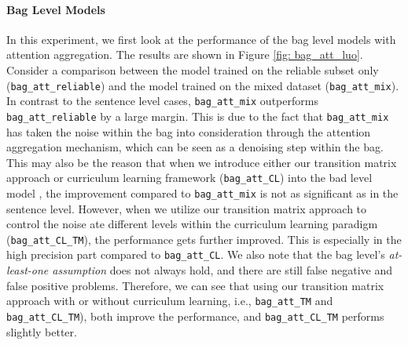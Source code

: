 \paragraph{Bag Level Models}
In this experiment, we first look at the performance of the bag level models with attention aggregation. The results are shown in Figure \ref{fig: bag_att_luo}.
Consider a comparison between the  model trained on the reliable subset only (\texttt{bag\_att\_reliable}) and  the model trained on the mixed dataset (\texttt{bag\_att\_mix}).
In contrast to the sentence level cases, \texttt{bag\_att\_mix} outperforms \texttt{bag\_att\_reliable} by a large margin. This is due to the fact that  \texttt{bag\_att\_mix} has taken the noise within the bag into consideration through the attention aggregation mechanism, which can be seen as a denoising step within the bag.
This may also be the reason that when we introduce either our transition matrix approach   or curriculum learning framework (\texttt{bag\_att\_CL})   into the bad level model , the improvement compared to \texttt{bag\_att\_mix}  is not as significant as in the sentence level.
However, when we utilize our transition matrix approach to control the noise ate different levels within the curriculum learning paradigm (\texttt{bag\_att\_CL\_TM}), the performance gets further improved. This is especially in the high precision part compared to \texttt{bag\_att\_CL}.
We also note that the bag level's  \textit{at-least-one assumption} does not always hold, and there are still false negative and false positive problems. Therefore, we can see that using our transition matrix approach with  or without curriculum learning, i.e.,  \texttt{bag\_att\_TM}  and \texttt{bag\_att\_CL\_TM}), both improve the performance, and \texttt{bag\_att\_CL\_TM} performs slightly better.


